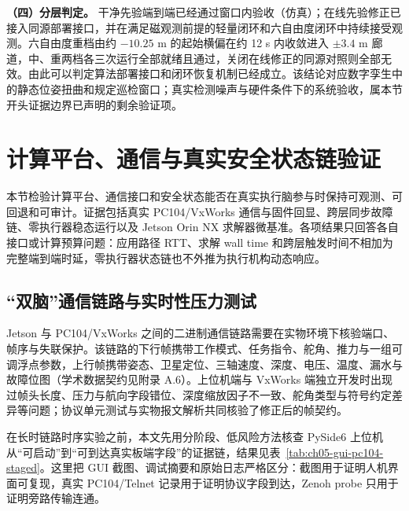 \textbf{（四）分层判定。} 干净先验端到端已经通过窗口内验收（仿真）；在线先验修正已接入同源部署接口，并在满足磁观测前提的轻量闭环和六自由度闭环中持续接受观测。六自由度重档由约 \(-10.25\text{ m}\) 的起始横偏在约 12 s 内收敛进入 \(\pm3.4\text{ m}\) 廊道，中、重两档各三次运行全部就绪且通过，关闭在线修正的同源对照则全部无效。由此可以判定算法部署接口和闭环恢复机制已经成立。该结论对应数字孪生中的静态位姿扭曲和规定巡检窗口；真实检测噪声与硬件条件下的系统验收，属本节开头证据边界已声明的剩余验证项。

\section{计算平台、通信与真实安全状态链验证}\label{sec:ch05-5-3}

本节检验计算平台、通信接口和安全状态能否在真实执行脑参与时保持可观测、可回退和可审计。证据包括真实 PC104/VxWorks 通信与固件回显、跨层同步故障链、零执行器稳态运行以及 Jetson Orin NX 求解器微基准。各项结果只回答各自接口或计算预算问题：应用路径 RTT、求解 wall time 和跨层触发时间不相加为完整端到端时延，零执行器状态链也不外推为执行机构动态响应。

\subsection{``双脑''通信链路与实时性压力测试}\label{sec:ch05-5-3-1}

Jetson 与 PC104/VxWorks 之间的二进制通信链路需要在实物环境下核验端口、帧序与失联保护。该链路的下行帧携带工作模式、任务指令、舵角、推力与一组可调浮点参数，上行帧携带姿态、卫星定位、三轴速度、深度、电压、温度、漏水与故障位图（学术数据契约见附录 A.6）。上位机端与 VxWorks 端独立开发时出现过帧头长度、压力与航向字段错位、深度缩放因子不一致、舵角类型与符号约定差异等问题；协议单元测试与实物报文解析共同核验了修正后的帧契约。

在长时链路时序实验之前，本文先用分阶段、低风险方法核查 PySide6 上位机从``可启动''到``可到达真实板端字段''的证据链，结果见表~\ref{tab:ch05-gui-pc104-staged}。这里把 GUI 截图、调试摘要和原始日志严格区分：截图用于证明人机界面可复现，真实 PC104/Telnet 记录用于证明协议字段到达，Zenoh probe 只用于证明旁路传输连通。

